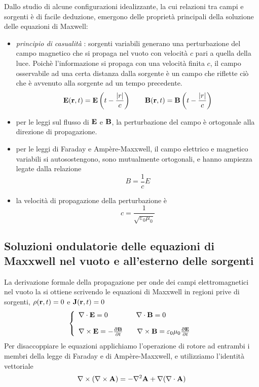 Dallo studio di alcune configurazioni idealizzante, la cui relazioni tra campi e sorgenti \`e di facile deduzione, emergono delle propriet\`a principali della soluzione delle equazioni di Maxwell: 
\begin{itemize}
	\item \textit{principio di casualit\`a }: sorgenti variabili generano una perturbazione del campo magnetico che si propaga nel vuoto con velocit\`a $c$ pari a quella della luce. Poich\`e l'informazione si propaga con una velocit\`a finita $c$, il campo osservabile ad una certa distanza dalla sorgente \`e un campo che riflette ci\`o che \`e avvenuto alla sorgente ad un tempo precedente.
	\begin{equation*}
		\bold{E}(\bold{r},t) = \bold{E}\left(t - \frac{|r|}{c}\right) \quad \quad \bold{B}(\bold{r},t) = \bold{B} \left(t - \frac{|r|}{c}\right)
	\end{equation*}
	\item per le leggi sul flusso di $\bold{E}$ e $\bold{B}$, la perturbazione del campo \`e ortogonale alla direzione di propagazione. 
	\item per le leggi di Faraday e Amp\`ere-Maxxwell, il campo elettrico e magnetico variabili si autosostengono, sono mutualmente ortogonali, e hanno ampiezza legate dalla relazione 
	\begin{equation*}
		B = \frac{1}{c}E
	\end{equation*}
	\item la velocit\`a di propagazione della perturbazione \`e  
	\begin{equation*}
		c = \frac{1}{\sqrt{\varepsilon_0 \mu_0}}
	\end{equation*}
\end{itemize}

\subsection{Soluzioni ondulatorie delle equazioni di Maxxwell nel vuoto e all'esterno delle sorgenti}

La derivazione formale della propagazione per onde dei campi elettromagnetici nel vuoto la si ottiene scrivendo le equazioni di Maxxwell in regioni prive di sorgenti, $\rho(\bold{r},t) = 0$ e $\bold{J}(\bold{r},t) = 0$
\begin{equation*}
\left \{ \begin{array}{l}
	 \nabla \cdot \bold{E} = 0  \quad \quad \quad \quad   \nabla \cdot \bold{B} = 0 \\ \rule{0pt}{20pt}
	 \nabla \times \bold{E} = - \frac{\partial \bold{B}}{\partial t} \quad \quad  \nabla \times \bold{B} = \varepsilon_0 \mu_0 \frac{\partial \bold{E}}{\partial t}\\ 
	\end{array}\right.
\end{equation*}
Per disaccoppiare le equazioni applichiamo l'operazione di rotore ad entrambi i membri della legge di Faraday e di Amp\`ere-Maxxwell, e utilizziamo l'identit\`a vettoriale 
\begin{equation*}
	\nabla \times (\nabla \times \bold{A} ) = - \nabla ^2\bold{A} + \nabla (\nabla \cdot \bold{A})
\end{equation*}


